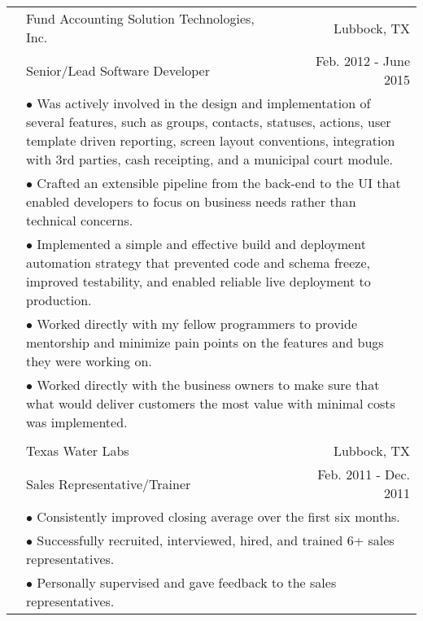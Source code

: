 \documentclass[11pt,oneside,letterpaper,titlepage,fleqn]{article}
\begin{document}
\begin{tabular}[h]{@{}p{3.25cm}@{}lr}
\\          				
& Fund Accounting Solution Technologies, Inc. & Lubbock, TX\\
           & Senior/Lead Software Developer & Feb. 2012 - June 2015\\
           & \multicolumn{2}{p{14cm}}{$\bullet$ Was actively involved in the design and implementation of several features, such as groups,
 contacts, statuses, actions, user template driven reporting, screen layout conventions,
integration with 3rd parties, cash receipting, and a municipal court module.}\\
           & \multicolumn{2}{p{14cm}}{$\bullet$ Crafted an extensible pipeline from the back-end to the UI that enabled developers to
 focus on business needs rather than technical concerns.}\\
           & \multicolumn{2}{p{14cm}}{$\bullet$ Implemented a simple and effective build and deployment automation strategy that prevented
 code and schema freeze, improved testability, and enabled reliable live deployment to production.}\\
           & \multicolumn{2}{p{14cm}}{$\bullet$ Worked directly with my fellow programmers to provide mentorship and minimize pain points
 on the features and bugs they were working on.}\\			
           & \multicolumn{2}{p{14cm}}{$\bullet$ Worked directly with the business owners to make sure that what would deliver customers the
 most value with minimal costs was implemented.}\\
\\
						& Texas Water Labs & Lubbock, TX\\
						& Sales Representative/Trainer	 &  Feb. 2011 - Dec. 2011\\
           & \multicolumn{2}{p{14cm}}{$\bullet$ Consistently improved closing average over the first six months.}\\
           & \multicolumn{2}{p{14cm}}{$\bullet$ Successfully recruited, interviewed, hired, and trained 6+ sales representatives.}\\
           & \multicolumn{2}{p{14cm}}{$\bullet$ Personally supervised and gave feedback to the sales representatives.}\\
\end{tabular}	
\newpage				
\end{document}
